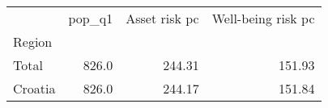 \begin{tabular}{lrrr}
\toprule
{} &  pop\_q1 &  Asset risk pc &  Well-being risk pc \\
Region  &         &                &                     \\
\midrule
Total   &   826.0 &         244.31 &              151.93 \\
Croatia &   826.0 &         244.17 &              151.84 \\
\bottomrule
\end{tabular}

